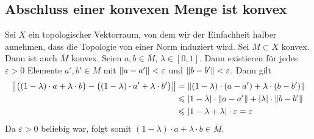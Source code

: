 \subsection{Abschluss einer konvexen Menge ist konvex} %
\label{sub:ab_konvex}
Sei $X$ ein topologischer Vektorraum, von dem wir der Einfachheit halber annehmen, dass die Topologie von einer Norm induziert wird. Sei $M \subset X$ konvex. Dann ist auch 
$\overline{M}$ konvex.
Seien $a,b \in \overline{M}$, $\lambda \in [0,1]$. Dann existieren für jedes $\varepsilon>0$ Elemente $a',b' \in M$ mit $\norm{a-a'}< \varepsilon$ und 
$\norm{b-b'}< \varepsilon$. Dann gilt
\begin{align*}
	\norm{\enbrace[\big]{(1-\lambda)\cdot a +\lambda \cdot b} -\enbrace[\big]{(1-\lambda)\cdot a'+\lambda \cdot b'}} &= \norm{(1-\lambda)\cdot (a-a') +\lambda\cdot (b-b')}\\
	&\le \abs*{1-\lambda} \cdot \norm{a-a'} + \abs*{\lambda} \cdot \norm{b-b'}  \\
	&\le \abs*{1- \lambda + \lambda} \cdot \varepsilon  = \varepsilon 
\end{align*}
Da $\varepsilon>0$ beliebig war, folgt somit $(1-\lambda) \cdot a + \lambda \cdot b \in \overline{M}$. \bewende

